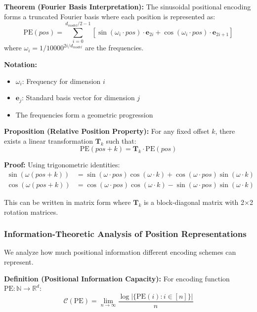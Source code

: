\documentclass[11pt]{article}
\begin{document}
\textbf{Theorem (Fourier Basis Interpretation):} The sinusoidal positional encoding forms a truncated Fourier basis where each position is represented as:
\begin{equation}
\text{PE}(pos) = \sum_{i=0}^{d_{model}/2-1} \left[\sin(\omega_i \cdot pos) \cdot \mathbf{e}_{2i} + \cos(\omega_i \cdot pos) \cdot \mathbf{e}_{2i+1}\right]
\end{equation}
where $\omega_i = 1/10000^{2i/d_{model}}$ are the frequencies.

\begin{notationbox}
\textbf{Notation:}
\begin{itemize}
    \item $\omega_i$: Frequency for dimension $i$
    \item $\mathbf{e}_j$: Standard basis vector for dimension $j$
    \item The frequencies form a geometric progression
\end{itemize}
\end{notationbox}

\textbf{Proposition (Relative Position Property):} For any fixed offset $k$, there exists a linear transformation $\mathbf{T}_k$ such that:
\begin{equation}
\text{PE}(pos + k) = \mathbf{T}_k \cdot \text{PE}(pos)
\end{equation}

\textbf{Proof:} Using trigonometric identities:
\begin{align}
\sin(\omega(pos + k)) &= \sin(\omega \cdot pos)\cos(\omega \cdot k) + \cos(\omega \cdot pos)\sin(\omega \cdot k) \\
\cos(\omega(pos + k)) &= \cos(\omega \cdot pos)\cos(\omega \cdot k) - \sin(\omega \cdot pos)\sin(\omega \cdot k)
\end{align}

This can be written in matrix form where $\mathbf{T}_k$ is a block-diagonal matrix with 2×2 rotation matrices.

\subsubsection{Information-Theoretic Analysis of Position Representations}

We analyze how much positional information different encoding schemes can represent.

\textbf{Definition (Positional Information Capacity):} For encoding function $\text{PE}: \mathbb{N} \rightarrow \mathbb{R}^d$:
\begin{equation}
\mathcal{C}(\text{PE}) = \lim_{n \rightarrow \infty} \frac{\log |\{\text{PE}(i) : i \in [n]\}|}{n}
\end{equation}
\end{document}
